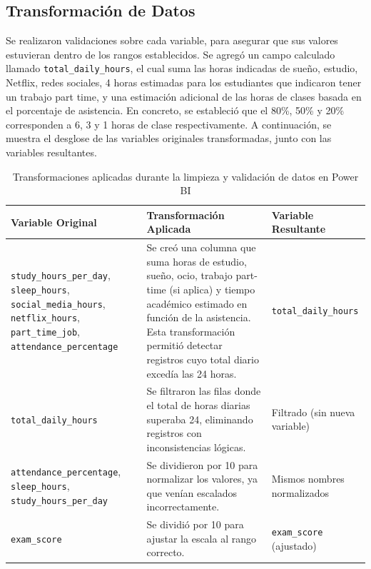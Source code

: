 \documentclass[12pt,letterpaper]{report}
\begin{document}
\subsection{Transformación de Datos}
Se realizaron validaciones sobre cada variable, para asegurar que sus valores estuvieran dentro de los rangos establecidos. 
Se agregó un campo calculado llamado \texttt{total\_daily\_hours}, el cual suma las horas indicadas de sueño, estudio, Netflix, redes sociales, 4 horas estimadas para los estudiantes que indicaron tener un trabajo part time, y una estimación adicional de las horas de clases basada en el porcentaje de asistencia. En concreto, se estableció que el 80\%, 50\% y 20\% corresponden a 6, 3 y 1 horas de clase respectivamente.  
A continuación, se muestra el desglose de las variables originales transformadas, junto con las variables resultantes.

\begin{table}[H]
    \centering
    \begin{tabularx}{\textwidth}{|l|X|l|}
        \hline
        \textbf{Variable Original} & \textbf{Transformación Aplicada} & \textbf{Variable Resultante} \\
        \hline
        \texttt{study\_hours\_per\_day}, \texttt{sleep\_hours}, \texttt{social\_media\_hours}, \texttt{netflix\_hours}, \texttt{part\_time\_job}, \texttt{attendance\_percentage} & Se creó una columna que suma horas de estudio, sueño, ocio, trabajo part-time (si aplica) y tiempo académico estimado en función de la asistencia. Esta transformación permitió detectar registros cuyo total diario excedía las 24 horas. & \texttt{total\_daily\_hours} \\
        \hline
        \texttt{total\_daily\_hours} & Se filtraron las filas donde el total de horas diarias superaba 24, eliminando registros con inconsistencias lógicas. & Filtrado (sin nueva variable) \\
        \hline
        \texttt{attendance\_percentage}, \texttt{sleep\_hours}, \texttt{study\_hours\_per\_day} & Se dividieron por 10 para normalizar los valores, ya que venían escalados incorrectamente. & Mismos nombres normalizados \\
        \hline
        \texttt{exam\_score} & Se dividió por 10 para ajustar la escala al rango correcto. & \texttt{exam\_score} (ajustado) \\
        \hline
    \end{tabularx}
    \caption{Transformaciones aplicadas durante la limpieza y validación de datos en Power BI}
\end{table}
\end{document}
